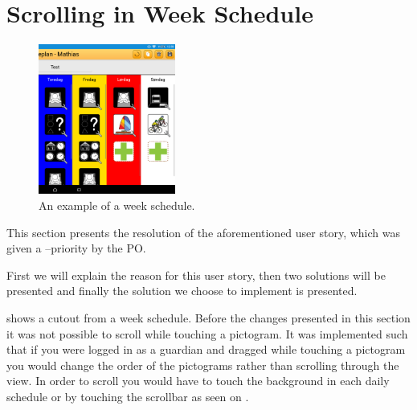 \section{Scrolling in Week Schedule}

\begin{figure} 
    \centering
        \includegraphics[width=0.4\textwidth]{figures/img/screenshots/weekplan_schedule.png}
    \caption{An example of a week schedule.}
    \label{fig:weekschedule}
    \vspace{-20pt}
\end{figure}

This section presents the resolution of the aforementioned user story, which was given a \phigh--priority by the PO.

First we will explain the reason for this user story, then two solutions will be presented and finally the solution we choose to implement is presented. 

 shows a cutout from a week schedule. 
Before the changes presented in this section it was not possible to scroll while touching a pictogram. 
It was implemented such that if you were logged in as a guardian and dragged while touching a pictogram you would change the order of the pictograms rather than scrolling through the view.
In order to scroll you would have to touch the background in each daily schedule or by touching the scrollbar as seen on .

